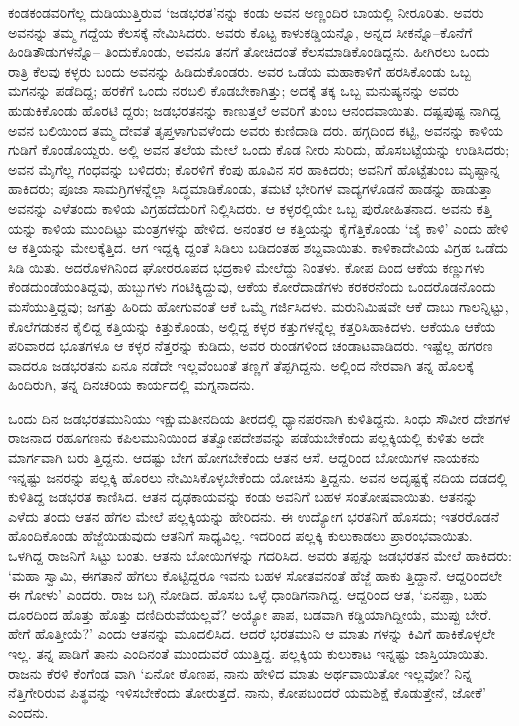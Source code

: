 ಕಂಡಕಂಡವರಿಗೆಲ್ಲ ದುಡಿಯುತ್ತಿರುವ ‘ಜಡಭರತ’ನನ್ನು ಕಂಡು ಅವನ ಅಣ್ಣಂದಿರ ಬಾಯಲ್ಲಿ ನೀರೂರಿತು. ಅವರು ಅವನನ್ನು ತಮ್ಮ ಗದ್ದೆಯ ಕೆಲಸಕ್ಕೆ ನೇಮಿಸಿದರು. ಅವರು ಕೊಟ್ಟ ಕಾಳುಕಡ್ಡಿಯನ್ನೊ, ಅನ್ನದ ಸೀಕನ್ನೊ–ಕೊನೆಗೆ ಹಿಂಡಿತೌಡುಗಳನ್ನೊ– ತಿಂದುಕೊಂಡು, ಅವನೂ ತನಗೆ ತೋಚಿದಂತೆ ಕೆಲಸಮಾಡಿಕೊಂಡಿದ್ದನು. ಹೀಗಿರಲು ಒಂದು ರಾತ್ರಿ ಕೆಲವು ಕಳ್ಳರು ಬಂದು ಅವನನ್ನು ಹಿಡಿದುಕೊಂಡರು. ಅವರ ಒಡೆಯ ಮಹಾಕಾಳಿಗೆ ಹರಸಿಕೊಂಡು ಒಬ್ಬ ಮಗನನ್ನು ಪಡೆದಿದ್ದ; ಹರಕೆಗೆ ಒಂದು ನರಬಲಿ ಕೊಡಬೇಕಾಗಿತ್ತು; ಅದಕ್ಕೆ ತಕ್ಕ ಒಬ್ಬ ಮನುಷ್ಯನನ್ನು ಅವರು ಹುಡುಕಿಕೊಂಡು ಹೊರಟಿ ದ್ದರು; ಜಡಭರತನನ್ನು ಕಾಣುತ್ತಲೆ ಅವರಿಗೆ ತುಂಬ ಆನಂದವಾಯಿತು. ದಷ್ಟಪುಷ್ಟ ನಾಗಿದ್ದ ಅವನ ಬಲಿಯಿಂದ ತಮ್ಮ ದೇವತೆ ತೃಪ್ತಳಾಗುವಳೆಂದು ಅವರು ಕುಣಿದಾಡಿ ದರು. ಹಗ್ಗದಿಂದ ಕಟ್ಟಿ, ಅವನನ್ನು ಕಾಳಿಯ ಗುಡಿಗೆ ಕೊಂಡೊಯ್ದರು. ಅಲ್ಲಿ ಅವನ ತಲೆಯ ಮೇಲೆ ಒಂದು ಕೊಡ ನೀರು ಸುರಿದು, ಹೊಸಬಟ್ಟೆಯನ್ನು ಉಡಿಸಿದರು; ಅವನ ಮೈಗೆಲ್ಲ ಗಂಧವನ್ನು ಬಳಿದರು; ಕೊರಳಿಗೆ ಕೆಂಪು ಹೂವಿನ ಸರ ಹಾಕಿದರು; ಅವನಿಗೆ ಹೊಟ್ಟೆತುಂಬ ಮೃಷ್ಟಾನ್ನ ಹಾಕಿದರು; ಪೂಜಾ ಸಾಮಗ್ರಿಗಳನ್ನೆಲ್ಲಾ ಸಿದ್ಧಮಾಡಿಕೊಂಡು, ತಮಟೆ ಭೇರಿಗಳ ವಾದ್ಯಗಳೊಡನೆ ಹಾಡನ್ನು ಹಾಡುತ್ತಾ ಅವನನ್ನು ಎಳೆತಂದು ಕಾಳಿಯ ವಿಗ್ರಹದೆದುರಿಗೆ ನಿಲ್ಲಿಸಿದರು. ಆ ಕಳ್ಳರಲ್ಲಿಯೇ ಒಬ್ಬ ಪುರೋಹಿತನಾದ. ಅವನು ಕತ್ತಿ ಯನ್ನು ಕಾಳಿಯ ಮುಂದಿಟ್ಟು ಮಂತ್ರಗಳನ್ನು ಹೇಳಿದ. ಅನಂತರ ಆ ಕತ್ತಿಯನ್ನು ಕೈಗೆತ್ತಿಕೊಂಡು ‘ಜೈ ಕಾಳಿ’ ಎಂದು ಹೇಳಿ ಆ ಕತ್ತಿಯನ್ನು ಮೇಲಕ್ಕೆತ್ತಿದ. ಆಗ ಇದ್ದಕ್ಕಿ ದ್ದಂತೆ ಸಿಡಿಲು ಬಡಿದಂತಹ ಶಬ್ದವಾಯಿತು. ಕಾಳಿಕಾದೇವಿಯ ವಿಗ್ರಹ ಒಡೆದು ಸಿಡಿ ಯಿತು. ಅದರೊಳಗಿನಿಂದ ಘೋರರೂಪದ ಭದ್ರಕಾಳಿ ಮೇಲೆದ್ದು ನಿಂತಳು. ಕೋಪ ದಿಂದ ಆಕೆಯ ಕಣ್ಣುಗಳು ಕೆಂಡದುಂಡೆಯಂತಿದ್ದವು, ಹುಬ್ಬುಗಳು ಗಂಟಿಕ್ಕಿದ್ದುವು, ಆಕೆಯ ಕೋರೆದಾಡೆಗಳು ಕರಕರನೆಂದು ಒಂದರೊಡನೊಂದು ಮಸೆಯುತ್ತಿದ್ದವು; ಜಗತ್ತು ಹಿರಿದು ಹೋಗುವಂತೆ ಆಕೆ ಒಮ್ಮೆ ಗರ್ಜಿಸಿದಳು. ಮರುನಿಮಿಷವೇ ಆಕೆ ದಾಬು ಗಾಲನ್ನಿಟ್ಟು, ಕೊಲೆಗಡುಕನ ಕೈಲಿದ್ದ ಕತ್ತಿಯನ್ನು ಕಿತ್ತುಕೊಂಡು, ಅಲ್ಲಿದ್ದ ಕಳ್ಳರ ಕತ್ತುಗಳನ್ನೆಲ್ಲ ಕತ್ತರಿಸಿಹಾಕಿದಳು. ಆಕೆಯೂ ಆಕೆಯ ಪರಿವಾರದ ಭೂತಗಳೂ ಆ ಕಳ್ಳರ ನೆತ್ತರನ್ನು ಕುಡಿದು, ಅವರ ರುಂಡಗಳಿಂದ ಚಂಡಾಟವಾಡಿದರು. ಇಷ್ಟೆಲ್ಲ ಹಗರಣ ವಾದರೂ ಜಡಭರತನು ಏನೂ ನಡೆದೇ ಇಲ್ಲವೆಂಬಂತೆ ತಣ್ಣಗೆ ತೆಪ್ಪಗಿದ್ದನು. ಅಲ್ಲಿಂದ ನೇರವಾಗಿ ತನ್ನ ಹೊಲಕ್ಕೆ ಹಿಂದಿರುಗಿ, ತನ್ನ ದಿನಚರಿಯ ಕಾರ್ಯದಲ್ಲಿ ಮಗ್ನನಾದನು.

ಒಂದು ದಿನ ಜಡಭರತಮುನಿಯು ಇಕ್ಷುಮತೀನದಿಯ ತೀರದಲ್ಲಿ ಧ್ಯಾನಪರನಾಗಿ ಕುಳಿತಿದ್ದನು. ಸಿಂಧು ಸೌವೀರ ದೇಶಗಳ ರಾಜನಾದ ರಹೂಗಣನು ಕಪಿಲಮುನಿಯಿಂದ ತತ್ವೋಪದೇಶವನ್ನು ಪಡೆಯಬೇಕೆಂದು ಪಲ್ಲಕ್ಕಿಯಲ್ಲಿ ಕುಳಿತು ಅದೇ ಮಾರ್ಗವಾಗಿ ಬರು ತ್ತಿದ್ದನು. ಆದಷ್ಟು ಬೇಗ ಹೋಗಬೇಕೆಂದು ಆತನ ಆಸೆ. ಆದ್ದರಿಂದ ಬೋಯಿಗಳ ನಾಯಕನು ಇನ್ನಷ್ಟು ಜನರನ್ನು ಪಲ್ಲಕ್ಕಿ ಹೊರಲು ನೇಮಿಸಿಕೊಳ್ಳಬೇಕೆಂದು ಯೋಚಿಸು ತ್ತಿದ್ದನು. ಅವನ ಅದೃಷ್ಟಕ್ಕೆ ನದಿಯ ದಡದಲ್ಲಿ ಕುಳಿತಿದ್ದ ಜಡಭರತ ಕಾಣಿಸಿದ. ಆತನ ದೃಢಕಾಯವನ್ನು ಕಂಡು ಅವನಿಗೆ ಬಹಳ ಸಂತೋಷವಾಯಿತು. ಆತನನ್ನು ಎಳೆದು ತಂದು ಆತನ ಹೆಗಲ ಮೇಲೆ ಪಲ್ಲಕ್ಕಿಯನ್ನು ಹೇರಿದನು. ಈ ಉದ್ಯೋಗ ಭರತನಿಗೆ ಹೊಸದು; ಇತರರೊಡನೆ ಹೊಂದಿಕೊಂಡು ಹೆಜ್ಜೆಯಿಡುವುದು ಆತನಿಗೆ ಸಾಧ್ಯವಿಲ್ಲ. ಇದರಿಂದ ಪಲ್ಲಕ್ಕಿ ಕುಲುಕಾಡಲು ಪ್ರಾರಂಭವಾಯಿತು. ಒಳಗಿದ್ದ ರಾಜನಿಗೆ ಸಿಟ್ಟು ಬಂತು. ಆತನು ಬೋಯಿಗಳನ್ನು ಗದರಿಸಿದ. ಅವರು ತಪ್ಪನ್ನು ಜಡಭರತನ ಮೇಲೆ ಹಾಕಿದರು: ‘ಮಹಾ ಸ್ವಾಮಿ, ಈಗತಾನೆ ಹೆಗಲು ಕೊಟ್ಟಿದ್ದರೂ ಇವನು ಬಹಳ ಸೋತವನಂತೆ ಹೆಜ್ಜೆ ಹಾಕು ತ್ತಿದ್ದಾನೆ. ಆದ್ದರಿಂದಲೇ ಈ ಗೋಳು’ ಎಂದರು. ರಾಜ ಬಗ್ಗಿ ನೋಡಿದ. ಹೊಸಬ ಒಳ್ಳೆ ಧಾಂಡಿಗನಾಗಿದ್ದ. ಆದ್ದರಿಂದ ಆತ, ‘ಏನಪ್ಪಾ, ಬಹು ದೂರದಿಂದ ಹೊತ್ತು ಹೊತ್ತು ದಣಿದಿರುವೆಯಲ್ಲವೆ? ಅಯ್ಯೋ ಪಾಪ, ಬಡವಾಗಿ ಕಡ್ಡಿಯಾಗಿದ್ದೀಯೆ, ಮುಪ್ಪು ಬೇರೆ. ಹೇಗೆ ಹೊತ್ತೀಯೆ?’ ಎಂದು ಆತನನ್ನು ಮೂದಲಿಸಿದ. ಆದರೆ ಭರತಮುನಿ ಆ ಮಾತು ಗಳನ್ನು ಕಿವಿಗೆ ಹಾಕಿಕೊಳ್ಳಲೇ ಇಲ್ಲ. ತನ್ನ ಪಾಡಿಗೆ ತಾನು ಎಂದಿನಂತೆ ಮುಂದುವರೆ ಯುತ್ತಿದ್ದ. ಪಲ್ಲಕ್ಕಿಯ ಕುಲುಕಾಟ ಇನ್ನಷ್ಟು ಜಾಸ್ತಿಯಾಯಿತು. ರಾಜನು ಕೆರಳಿ ಕೆಂಗೆಂಡ ವಾಗಿ ‘ಏನೋ ಠೊಣಪ, ನಾನು ಹೇಳಿದ ಮಾತು ಅರ್ಥವಾಯಿತೋ ಇಲ್ಲವೋ? ನಿನ್ನ ನೆತ್ತಿಗೇರಿರುವ ಪಿತ್ಥವನ್ನು ಇಳಿಸಬೇಕೆಂದು ತೋರುತ್ತದೆ. ನಾನು, ಕೋಪಬಂದರೆ ಯಮಶಿಕ್ಷೆ ಕೊಡುತ್ತೇನೆ, ಜೋಕೆ’ ಎಂದನು.

